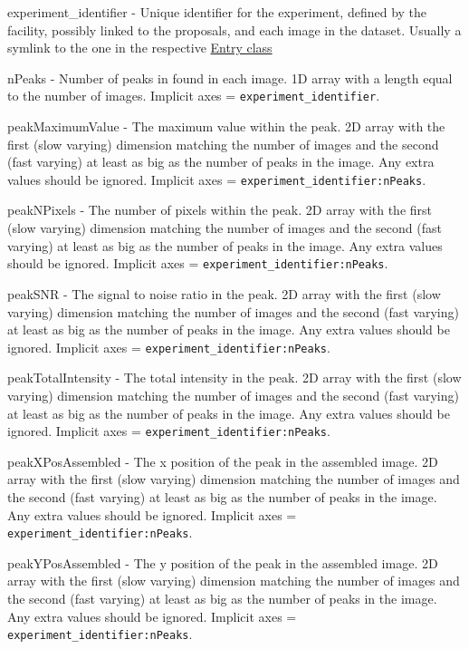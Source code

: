 \documentclass[usletter,11pt]{article}
\newcommand{\member}[2]
{ \noindent
{ \color{softBlue}  #1 - } #2
\vspace{0.2cm}
}
\begin{document}
\member{experiment\_identifier}{Unique identifier for the experiment,
defined by the facility, possibly linked to the proposals, and each image in the
dataset. Usually a symlink to the one in the respective \hyperref[table:entry]{Entry class}}

\member{nPeaks}{Number of peaks in found in each image. 1D array with a length
  equal to the number of images. Implicit axes = {\tt experiment\_identifier}.}

\member{peakMaximumValue}{The maximum value within the peak. 2D array with the
  first (slow varying) dimension matching the number of images and the second
  (fast varying) at least as big as the number of peaks in
  the image. Any extra values should be ignored. Implicit axes = {\tt experiment\_identifier:nPeaks}.}

\member{peakNPixels}{The number of pixels within the peak. 2D array with the
  first (slow varying) dimension matching the number of images and the second
  (fast varying) at least as big as the number of peaks in
  the image. Any extra values should be ignored. Implicit axes = {\tt experiment\_identifier:nPeaks}.}

\member{peakSNR}{The signal to noise ratio in the peak. 2D array with the
  first (slow varying) dimension matching the number of images and the second
  (fast varying) at least as big as the number of peaks in
  the image. Any extra values should be ignored. Implicit axes = {\tt experiment\_identifier:nPeaks}.}

\member{peakTotalIntensity}{The total intensity in the peak. 2D array with the
  first (slow varying) dimension matching the number of images and the second
  (fast varying) at least as big as the number of peaks in
  the image. Any extra values should be ignored. Implicit axes = {\tt experiment\_identifier:nPeaks}.}

\member{peakXPosAssembled}{The x position of the peak in the assembled image. 2D array with the
  first (slow varying) dimension matching the number of images and the second
  (fast varying) at least as big as the number of peaks in
  the image. Any extra values should be ignored. Implicit axes = {\tt experiment\_identifier:nPeaks}.}

\member{peakYPosAssembled}{The y position of the peak in the assembled image. 2D array with the
  first (slow varying) dimension matching the number of images and the second
  (fast varying) at least as big as the number of peaks in
  the image. Any extra values should be ignored. Implicit axes = {\tt experiment\_identifier:nPeaks}.}
\end{document}
